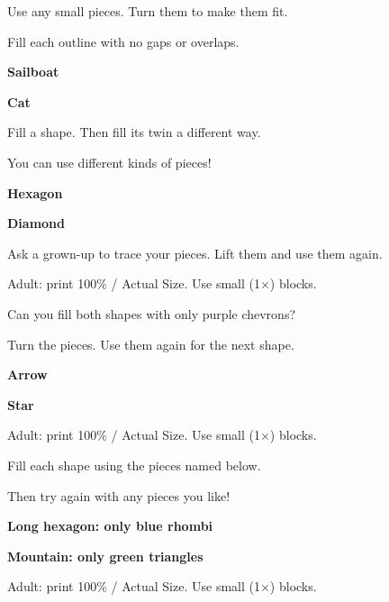 \documentclass[14pt]{extarticle}
\newcommand{\Mat}[2]{\begin{center}\textbf{#1}\par\vspace{7pt}\DrawOutline{#2}\end{center}}
\newcommand{\MatPair}[2]{\par\textbf{#1}\par\vspace{2pt}\Pair{#2}}
\newcommand{\SmallPrintNote}{{\fontsize{9}{11}\selectfont Adult: print 100\% / Actual Size. Use small (1\(\times\)) blocks.\par}}
\begin{document}
\NameLine
Use any small pieces. Turn them to make them fit.\par
Fill each outline with no gaps or overlaps.
\vspace{6pt}
\Mat{Sailboat}{\KSailboatPath}
\vfill
\Mat{Cat}{\KCatPath}
\ScaleCheck
\newpage
{}\NameLine
Fill a shape. Then fill its twin a different way.\par
You can use different kinds of pieces!
\vspace{8pt}
\MatPair{Hexagon}{\KHexagonPath}
\vfill
\MatPair{Diamond}{\KDiamondPath}
\vfill
{\small Ask a grown-up to trace your pieces. Lift them and use them again.}\par
\SmallPrintNote
\newpage
{}\NameLine
Can you fill both shapes with only purple chevrons?\par
Turn the pieces. Use them again for the next shape.
\vspace{2pt}
\Mat{Arrow}{\KArrowPath}
\vfill
\Mat{Star}{\KStarPath}
\vfill
\SmallPrintNote
\newpage
{}\NameLine
Fill each shape using the pieces named below.\par
Then try again with any pieces you like!
\vspace{7pt}
\Mat{Long hexagon: only blue rhombi}{\KLongHexagonPath}
\vfill
\Mat{Mountain: only green triangles}{\KMountainPath}
\vfill
\SmallPrintNote
\end{document}
